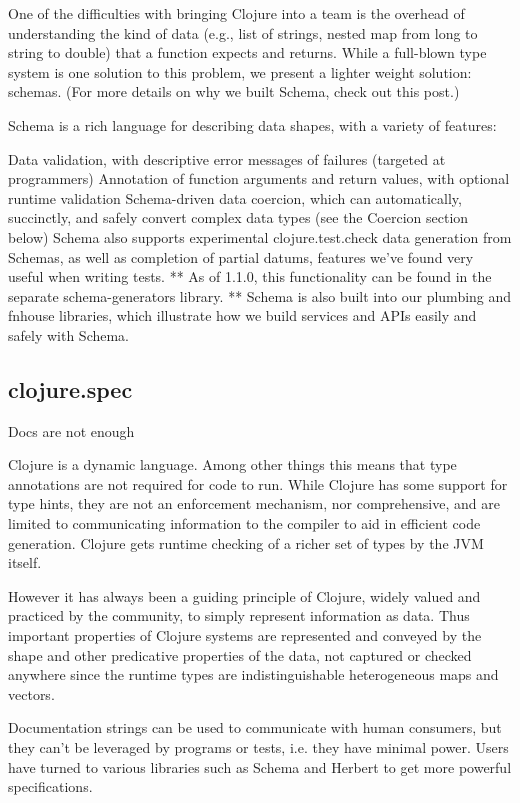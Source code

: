 One of the difficulties with bringing Clojure into a team is the overhead of understanding the kind of data (e.g., list of strings, nested map from long to string to double) that a function expects and returns. While a full-blown type system is one solution to this problem, we present a lighter weight solution: schemas. (For more details on why we built Schema, check out this post.)

Schema is a rich language for describing data shapes, with a variety of features:

Data validation, with descriptive error messages of failures (targeted at programmers)
Annotation of function arguments and return values, with optional runtime validation
Schema-driven data coercion, which can automatically, succinctly, and safely convert complex data types (see the Coercion section below)
Schema also supports experimental clojure.test.check data generation from Schemas, as well as completion of partial datums, features we've found very useful when writing tests. ** As of 1.1.0, this functionality can be found in the separate schema-generators library. **
Schema is also built into our plumbing and fnhouse libraries, which illustrate how we build services and APIs easily and safely with Schema.

\subsection{clojure.spec}
Docs are not enough

Clojure is a dynamic language. Among other things this means that type
annotations are not required for code to run. While Clojure has some support for
type hints, they are not an enforcement mechanism, nor comprehensive, and are
limited to communicating information to the compiler to aid in efficient code
generation. Clojure gets runtime checking of a richer set of types by the JVM
itself.

However it has always been a guiding principle of Clojure, widely valued and
practiced by the community, to simply represent information as data. Thus
important properties of Clojure systems are represented and conveyed by the
shape and other predicative properties of the data, not captured or checked
anywhere since the runtime types are indistinguishable heterogeneous maps and
vectors.

Documentation strings can be used to communicate with human consumers, but they
can’t be leveraged by programs or tests, i.e. they have minimal power. Users
have turned to various libraries such as Schema and Herbert to get more powerful
specifications.

